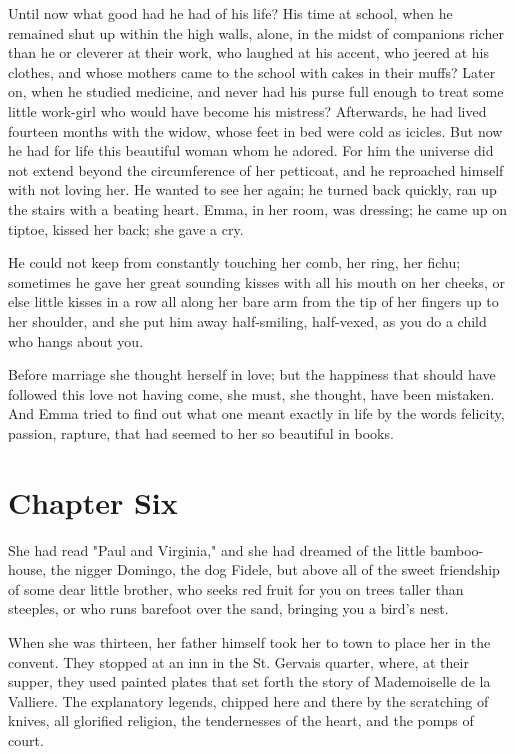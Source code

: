 \documentclass{tufte-book}
\begin{document}
Until now what good had he had of his life? His time at school, when
he remained shut up within the high walls, alone, in the midst of
companions richer than he or cleverer at their work, who laughed at his
accent, who jeered at his clothes, and whose mothers came to the school
with cakes in their muffs? Later on, when he studied medicine, and never
had his purse full enough to treat some little work-girl who would have
become his mistress? Afterwards, he had lived fourteen months with the
widow, whose feet in bed were cold as icicles. But now he had for life
this beautiful woman whom he adored. For him the universe did not extend
beyond the circumference of her petticoat, and he reproached himself
with not loving her. He wanted to see her again; he turned back quickly,
ran up the stairs with a beating heart. Emma, in her room, was dressing;
he came up on tiptoe, kissed her back; she gave a cry.

He could not keep from constantly touching her comb, her ring, her
fichu; sometimes he gave her great sounding kisses with all his mouth on
her cheeks, or else little kisses in a row all along her bare arm
from the tip of her fingers up to her shoulder, and she put him away
half-smiling, half-vexed, as you do a child who hangs about you.

Before marriage she thought herself in love; but the happiness that
should have followed this love not having come, she must, she thought,
have been mistaken. And Emma tried to find out what one meant exactly in
life by the words felicity, passion, rapture, that had seemed to her so
beautiful in books.



\chapter{Chapter Six}

She had read "Paul and Virginia," and she had dreamed of the little
bamboo-house, the nigger Domingo, the dog Fidele, but above all of the
sweet friendship of some dear little brother, who seeks red fruit for
you on trees taller than steeples, or who runs barefoot over the sand,
bringing you a bird's nest.

When she was thirteen, her father himself took her to town to place
her in the convent. They stopped at an inn in the St. Gervais quarter,
where, at their supper, they used painted plates that set forth the
story of Mademoiselle de la Valliere. The explanatory legends, chipped
here and there by the scratching of knives, all glorified religion, the
tendernesses of the heart, and the pomps of court.
\end{document}
